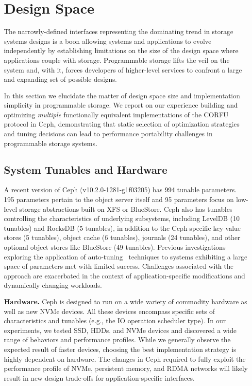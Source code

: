 \section{Design Space}
\label{sec:dspace}

The narrowly-defined interfaces representing the dominating trend in storage systems designs
is a boon allowing systems and applications to evolve independently by establishing limitations on the
size of the design space where applications couple with storage. Programmable
storage lifts the veil on the system and, with it, forces developers of higher-level services
to confront a large and expanding set of possible designs.

In this section we elucidate the matter of design space size and implementation simplicity in
programmable storage. We report on our experience building and optimizing
\emph{multiple} functionally equivalent implementations of the CORFU protocol
in Ceph, demonstrating that static selection of optimization strategies and tuning
decisions can lead to performance portability challenges in programmable
storage systems.

\subsection{System Tunables and Hardware}

A recent version of Ceph (v10.2.0-1281-g1f03205) has 994 tunable parameters.
195 parameters pertain to the object server itself and 95 parameters focus on
low-level storage abstractions built on XFS or BlueStore. Ceph also has
tunables controlling the characteristics of underlying subsystems, including LevelDB (10 tunables) and RocksDB (5
tunables), in addition to the Ceph-specific key-value stores (5 tunables), object cache (6
tunables), journals (24 tunables), and other optional object stores
like BlueStore (49 tunables).  Previous investigations exploring the application of 
auto-tuning~\cite{behzad:sc2013-autotuning} techniques to systems exhibiting a large space of parameters 
met with limited success. Challenges associated with the approach are exacerbated in the context of
application-specific modifications and dynamically changing workloads.

{\bf Hardware.} Ceph is designed to run on a wide variety of commodity
hardware as well as new NVMe devices. All these devices encompass specific sets of
characteristics and tunables (e.g., the IO operation scheduler type). In our
experiments, we tested SSD, HDDs, and NVMe devices and discovered a wide range of
behaviors and performance profiles. While we generally observe the expected
result of faster devices, choosing the best implementation strategy is highly dependent on hardware. The changes
in Ceph required to fully exploit the performance profile of NVMe, persistent
memory, and RDMA networks will likely result in new design trade-offs for
application-specific interfaces.


